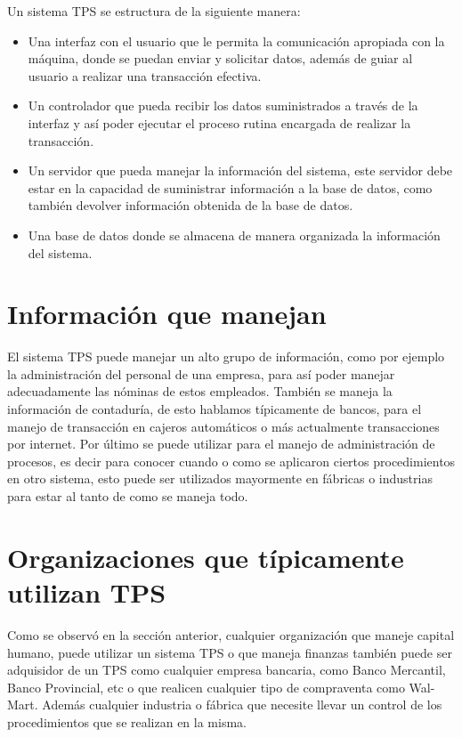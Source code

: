 Un sistema TPS se estructura de la siguiente manera:
\begin{itemize}
\item Una interfaz con el usuario que le permita la comunicación apropiada con la máquina, donde se puedan enviar y solicitar datos, además de guiar al usuario a realizar una transacción efectiva.
\item Un controlador que pueda recibir los datos suministrados a través de la interfaz y así poder ejecutar el proceso rutina encargada de realizar la transacción.
\item Un servidor que pueda manejar la información del sistema, este servidor debe estar en la capacidad de suministrar información a la base de datos, como también devolver información obtenida de la base de datos.
\item Una base de datos donde se almacena  de manera organizada la información del sistema.   
\end{itemize}

\section {Información que manejan}

El sistema TPS puede manejar un alto grupo de información, como por ejemplo la administración del personal de una empresa, para así poder manejar adecuadamente las nóminas de estos empleados.
También se maneja la información de contaduría, de esto hablamos típicamente de bancos, para el manejo de transacción en cajeros automáticos o más actualmente transacciones por internet.
Por último se puede utilizar para el manejo de administración de procesos, es decir para conocer cuando o como se aplicaron ciertos procedimientos en otro sistema, esto puede ser utilizados mayormente en fábricas o industrias para estar al tanto de como se maneja todo.


\section {Organizaciones que típicamente utilizan TPS}

Como se observó en la sección anterior, cualquier organización que maneje capital humano, puede utilizar un sistema TPS o que maneja finanzas también puede ser adquisidor de un TPS como cualquier empresa bancaria, como Banco Mercantil, Banco Provincial, etc o que realicen cualquier tipo de compraventa como Wal-Mart.
Además cualquier industria o fábrica que necesite llevar un control de los procedimientos que se realizan en la misma.

